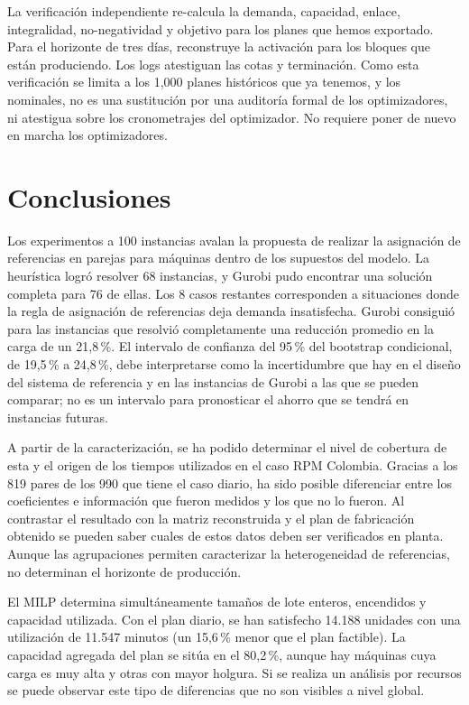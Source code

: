 \documentclass[12pt,a4paper,oneside]{article}
\begin{document}
La verificación independiente re-calcula la demanda, capacidad, enlace, integralidad, no-negatividad y objetivo para los planes que hemos exportado. Para el horizonte de tres días, reconstruye la activación para los bloques que están produciendo. Los logs atestiguan las cotas y terminación. Como esta verificación se limita a los 1,000 planes históricos que ya tenemos, y los nominales, no es una sustitución por una auditoría formal de los optimizadores, ni atestigua sobre los cronometrajes del optimizador. No requiere poner de nuevo en marcha los optimizadores.

\section{Conclusiones}
Los experimentos a 100 instancias avalan la propuesta de realizar la asignación de referencias en parejas para máquinas dentro de los supuestos del modelo. La heurística logró resolver 68 instancias, y Gurobi pudo encontrar una solución completa para 76 de ellas. Los 8 casos restantes corresponden a situaciones donde la regla de asignación de referencias deja demanda insatisfecha. Gurobi consiguió para las instancias que resolvió completamente una reducción promedio en la carga de un 21,8\,\%. El intervalo de confianza del 95\,\% del bootstrap condicional, de 19,5\,\% a 24,8\,\%, debe interpretarse como la incertidumbre que hay en el diseño del sistema de referencia y en las instancias de Gurobi a las que se pueden comparar; no es un intervalo para pronosticar el ahorro que se tendrá en instancias futuras.

A partir de la caracterización, se ha podido determinar el nivel de cobertura de esta y el origen de los tiempos utilizados en el caso RPM Colombia. Gracias a los 819 pares de los 990 que tiene el caso diario, ha sido posible diferenciar entre los coeficientes e información que fueron medidos y los que no lo fueron. Al contrastar el resultado con la matriz reconstruida y el plan de fabricación obtenido se pueden saber cuales de estos datos deben ser verificados en planta. Aunque las agrupaciones permiten caracterizar la heterogeneidad de referencias, no determinan el horizonte de producción.

El MILP determina simultáneamente tamaños de lote enteros, encendidos y capacidad utilizada. Con el plan diario, se han satisfecho 14.188 unidades con una utilización de 11.547 minutos (un 15,6\,\% menor que el plan factible). La capacidad agregada del plan se sitúa en el 80,2\,\%, aunque hay máquinas cuya carga es muy alta y otras con mayor holgura. Si se realiza un análisis por recursos se puede observar este tipo de diferencias que no son visibles a nivel global.
\end{document}
